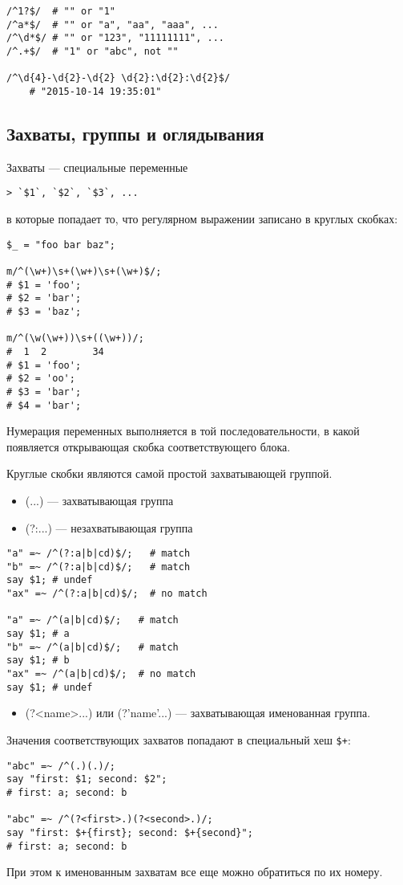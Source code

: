 \begin{verbatim}
/^1?$/  # "" or "1"
/^a*$/  # "" or "a", "aa", "aaa", ...
/^\d*$/ # "" or "123", "11111111", ...
/^.+$/  # "1" or "abc", not ""

/^\d{4}-\d{2}-\d{2} \d{2}:\d{2}:\d{2}$/
	# "2015-10-14 19:35:01"
\end{verbatim}

\subsection{Захваты, группы и оглядывания} %
Захваты --- специальные переменные
\begin{verbatim}
> `$1`, `$2`, `$3`, ...
\end{verbatim}
в которые попадает то, что регулярном выражении записано в круглых скобках:
\begin{verbatim}
$_ = "foo bar baz";

m/^(\w+)\s+(\w+)\s+(\w+)$/;
# $1 = 'foo';
# $2 = 'bar';
# $3 = 'baz';

m/^(\w(\w+))\s+((\w+))/;
#  1  2        34
# $1 = 'foo';
# $2 = 'oo';
# $3 = 'bar';
# $4 = 'bar';
\end{verbatim}
Нумерация переменных выполняется в той последовательности, в какой появляется открывающая скобка соответствующего блока.

Круглые скобки являются самой простой захватывающей группой.
\begin{itemize}[nosep]
  \item (...) --- захватывающая группа
  \item (?:...) --- незахватывающая группа
\end{itemize}

\begin{verbatim}
"a" =~ /^(?:a|b|cd)$/;   # match
"b" =~ /^(?:a|b|cd)$/;   # match
say $1; # undef
"ax" =~ /^(?:a|b|cd)$/;  # no match

"a" =~ /^(a|b|cd)$/;   # match
say $1; # a
"b" =~ /^(a|b|cd)$/;   # match
say $1; # b
"ax" =~ /^(a|b|cd)$/;  # no match
say $1; # undef
\end{verbatim}

\begin{itemize}[nosep]
  \item (?<name>...) или (?'name'...) --- захватывающая именованная группа.
\end{itemize}
Значения соответствующих захватов попадают в специальный хеш \verb|$+|:
\begin{verbatim}
"abc" =~ /^(.)(.)/;
say "first: $1; second: $2";
# first: a; second: b

"abc" =~ /^(?<first>.)(?<second>.)/;
say "first: $+{first}; second: $+{second}";
# first: a; second: b
\end{verbatim}
При этом к именованным захватам все еще можно обратиться по их номеру.

